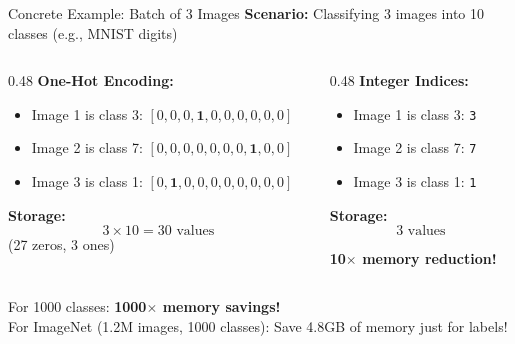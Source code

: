 \documentclass[xcolor=svgnames, 8pt, handout, standalone]{beamer}
\newcommand{\1}{\mathbf{1}}
\begin{document}
\begin{frame}{Concrete Example: Batch of 3 Images}
\textbf{Scenario:} Classifying 3 images into 10 classes (e.g., MNIST digits)

\vspace{0.5em}
\begin{columns}
\begin{column}{0.48\textwidth}
\textbf{One-Hot Encoding:}
\begin{itemize}
\item Image 1 is class 3: $[0,0,0,\mathbf{1},0,0,0,0,0,0]$
\item Image 2 is class 7: $[0,0,0,0,0,0,0,\mathbf{1},0,0]$
\item Image 3 is class 1: $[0,\mathbf{1},0,0,0,0,0,0,0,0]$
\end{itemize}

\vspace{0.3em}
\textbf{Storage:}
$$3 \times 10 = 30 \text{ values}$$
(27 zeros, 3 ones)
\end{column}
\begin{column}{0.48\textwidth}
\textbf{Integer Indices:}
\begin{itemize}
\item Image 1 is class 3: \texttt{3}
\item Image 2 is class 7: \texttt{7}
\item Image 3 is class 1: \texttt{1}
\end{itemize}

\vspace{0.3em}
\textbf{Storage:}
$$3 \text{ values}$$

\vspace{0.3em}
\textcolor{deepgreen}{\textbf{10$\times$ memory reduction!}}
\end{column}
\end{columns}

\vspace{0.5em}
\pause
\begin{tcolorbox}[colback=lightyellow, colframe=energyorange, boxrule=1pt]
For 1000 classes: \textbf{1000$\times$ memory savings!}\\
For ImageNet (1.2M images, 1000 classes): Save 4.8GB of memory just for labels!
\end{tcolorbox}
\end{frame}
\end{document}
